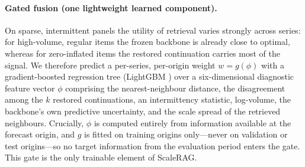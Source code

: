 \paragraph{Gated fusion (one lightweight learned component).} On sparse, intermittent panels the utility of retrieval varies strongly across series: for high-volume, regular items the frozen backbone is already close to optimal, whereas for zero-inflated items the restored continuation carries most of the signal. We therefore predict a per-series, per-origin weight $w = g(\phi)$ with a gradient-boosted regression tree (LightGBM \cite{lightgbm}) over a six-dimensional diagnostic feature vector $\phi$ comprising the nearest-neighbour distance, the disagreement among the $k$ restored continuations, an intermittency statistic, log-volume, the backbone's own predictive uncertainty, and the scale spread of the retrieved neighbours. Crucially, $\phi$ is computed entirely from information available at the forecast origin, and $g$ is fitted on training origins only---never on validation or test origins---so no target information from the evaluation period enters the gate. This gate is the only trainable element of ScaleRAG.
